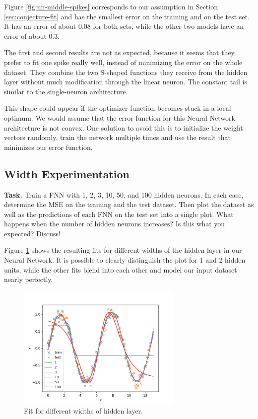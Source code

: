 \documentclass{support/acm_proc_article-sp}
\begin{document}
    Figure \ref{fig:nn-middle-spikes} corresponds to our assumption in Section \ref{sec:conjecture-fit} and has the smallest
    error on the training and on the test set.
    It has an error of about $0.08$ for both sets, while the other two models have an error of about $0.3$.

    The first and second results are not as expected, because it seems that they prefer to fit one spike really well,
    instead of minimizing the error on the whole dataset.
    They combine the two S-shaped functions they receive from the hidden layer without much modification through
    the linear neuron.
    The constant tail is similar to the single-neuron architecture.

    This shape could appear if the optimizer function becomes stuck in a local optimum.
    We would assume that the error function for this Neural Network architecture is not convex.
    One solution to avoid this is to initialize the weight vectors randomly, train the network multiple times and use
    the result that minimizes our error function.



    \subsection{Width Experimentation}
    \label{sec:width-experimentation}

    \textbf{Task.} Train a FNN with 1, 2, 3, 10, 50, and 100 hidden neurons.
    In each case, determine the MSE on the training and the test dataset.
    Then plot the dataset as well as the predictions of each FNN on the test set into a single plot.
    What happens when the number of hidden neurons increases?
    Is this what you expected?
    Discuss!

    Figure \ref{fig:nn-width} shows the resulting fits for different widths of the hidden layer in our Neural Network.
    It is possible to clearly distinguish the plot for 1 and 2 hidden units, while the other fits blend into each other
    and model our input dataset nearly perfectly.
    \begin{figure}[!htbp]
        \centering
        \includegraphics[width=8cm]{images/nn-width.png}
        \caption{Fit for different widths of hidden layer.}
        \label{fig:nn-width}
    \end{figure}
\end{document}
